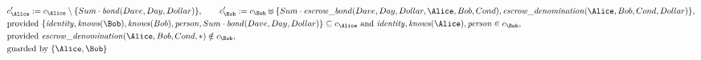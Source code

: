 \begin{align*}
&
c'_
{
\Alice
}
 := 
c_
{
\Alice
}
 \setminus 
\{
Sum
\cdot
\mathit{\detokenize{
bond
}}
(
Dave
,
Day
,
Dollar
)
\}
, \qquad 
c'_
{
\Bob
}
 := 
c_
{
\Bob
}
 \uplus 
\{
Sum
\cdot
\mathit{\detokenize{
escrow_bond
}}
(
Dave
,
Day
,
Dollar
,
\Alice
,
Bob
,
Cond
)
,
\mathit{\detokenize{
escrow_denomination
}}
(
\Alice
,
Bob
,
Cond
,
Dollar
)
\}
,\\
&
\text{provided } 
\{
\mathit{\detokenize{
identity
}}
,
\mathit{\detokenize{
knows
}}
(
\Bob
)
,
\mathit{\detokenize{
knows
}}
(
Bob
)
,
\mathit{\detokenize{
person
}}
,
Sum
\cdot
\mathit{\detokenize{
bond
}}
(
Dave
,
Day
,
Dollar
)
\}
 \subseteq c_
{
\Alice
}
 \text{ and } 
\mathit{\detokenize{
identity
}}
,
\mathit{\detokenize{
knows
}}
(
\Alice
)
,
\mathit{\detokenize{
person
}}
 \in c_
{
\Bob
}
,\\
&
\text{provided } 
\mathit{\detokenize{
escrow_denomination
}}
(
\Alice
,
Bob
,
Cond
,
\ast
)
 \notin c_
{
\Bob
}
,\\
&
\text{guarded by } \{
\Alice
,
\Bob
\}
\end{align*}

